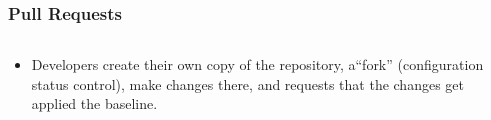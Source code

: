 \documentclass[12pt]{beamer}
\begin{document}
\begin{frame}
\frametitle{Pull Requests}

\begin{columns}
\begin{column}{0.5\textwidth}
    \begin{itemize}
    \item{Developers create their own copy of the repository, a``fork''
    (\alert{configuration status control}), make changes there, and requests
    that the changes get applied the baseline.}
    \end{itemize}
\end{column}
\begin{column}{0.5\textwidth}

\end{column}
\end{columns}
\end{frame}
\end{document}
